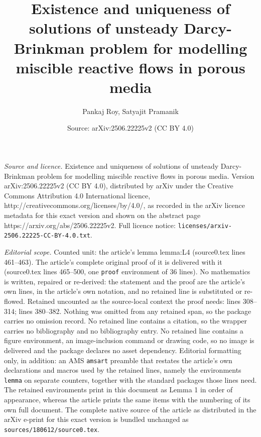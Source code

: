 \documentclass[10pt,a4paper]{amsart}
\title{Existence and uniqueness of solutions of unsteady Darcy-Brinkman problem for modelling miscible reactive flows in porous media}
\author{Pankaj Roy, Satyajit Pramanik}
\date{Source: arXiv:2506.22225v2 (CC BY 4.0)}
\begin{document}
\maketitle

\noindent\emph{Source and licence.} Existence and uniqueness of solutions of unsteady Darcy-Brinkman problem for modelling miscible reactive flows in porous media. Version arXiv:2506.22225v2 (CC BY 4.0), distributed by arXiv under the Creative Commons Attribution 4.0 International licence, http://creativecommons.org/licenses/by/4.0/, as recorded in the arXiv licence metadata for this exact version and shown on the abstract page https://arxiv.org/abs/2506.22225v2. Full licence notice: \texttt{licenses/arxiv-2506.22225-CC-BY-4.0.txt}.\par\smallskip

\noindent\textit{Editorial scope.} Counted unit: the article's lemma lemma:L4 (source0.tex lines 461--463). The article's complete original proof of it is delivered with it (source0.tex lines 465--500, one \texttt{proof} environment of 36 lines). No mathematics is written, repaired or re-derived: the statement and the proof are the article's own lines, in the article's own notation, and no retained line is substituted or re-flowed.  Retained uncounted as the source-local context the proof needs: lines 308--314; lines 380--382.  Nothing was omitted from any retained span, so the package carries no omission record.  No retained line contains a citation, so the wrapper carries no bibliography and no bibliography entry.  No retained line contains a figure environment, an image-inclusion command or drawing code, so no image is delivered and the package declares no asset dependency.  Editorial formatting only, in addition: an AMS \texttt{amsart} preamble that restates the article's own declarations and macros used by the retained lines, namely the environments \texttt{lemma} on separate counters, together with the standard packages those lines need.  The retained environments print in this document as Lemma 1 in order of appearance, whereas the article prints the same items with the numbering of its own full document.  The complete native source of the article as distributed in the arXiv e-print for this exact version is bundled unchanged as \texttt{sources/180612/source0.tex}.
\end{document}
